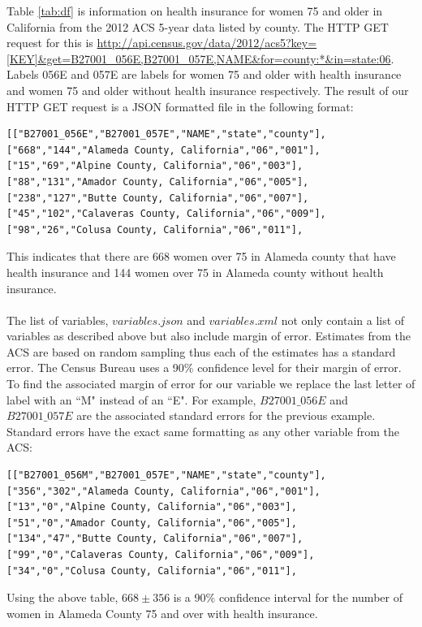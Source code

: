 \documentclass{article}\usepackage[]{graphicx}\usepackage[]{color}
\begin{document}
Table \ref{tab:df} is information on health insurance for women 75 and older in California from the 2012 ACS 5-year data listed by county.  The HTTP GET request for this is \url{http://api.census.gov/data/2012/acs5?key=[KEY]&get=B27001_056E,B27001_057E,NAME&for=county:*&in=state:06}.  Labels 056E and 057E are labels for women 75 and older with health insurance and women 75 and older without health insurance respectively.  The result of our HTTP GET request is a JSON formatted file in the following format:
\begin{verbatim}
[["B27001_056E","B27001_057E","NAME","state","county"],
["668","144","Alameda County, California","06","001"],
["15","69","Alpine County, California","06","003"],
["88","131","Amador County, California","06","005"],
["238","127","Butte County, California","06","007"],
["45","102","Calaveras County, California","06","009"],
["98","26","Colusa County, California","06","011"],
\end{verbatim}
This indicates that there are 668 women over 75 in Alameda county that have health insurance and 144 women over 75 in Alameda county without health insurance.\\
\\
The list of variables, $variables.json$ and $variables.xml$ not only contain a list of variables as described above but also include margin of error.  Estimates from the ACS are based on random sampling thus each of the estimates has a standard error.  The Census Bureau uses a 90$\%$ confidence level for their margin of error.  To find the associated margin of error for our variable we replace the last letter of label with an ``M" instead of an ``E".  For example, $B27001\_056E$ and $B27001\_057E$ are the associated standard errors for the previous example.  Standard errors have the exact same formatting as any other variable from the ACS:
\begin{verbatim}
[["B27001_056M","B27001_057E","NAME","state","county"],
["356","302","Alameda County, California","06","001"],
["13","0","Alpine County, California","06","003"],
["51","0","Amador County, California","06","005"],
["134","47","Butte County, California","06","007"],
["99","0","Calaveras County, California","06","009"],
["34","0","Colusa County, California","06","011"],
\end{verbatim}
Using the above table, $668 \pm 356$ is a 90$\%$ confidence interval for the number of women in Alameda County 75 and over with health insurance.
\end{document}
